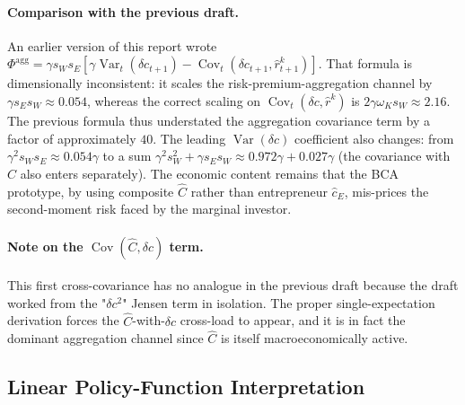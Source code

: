 \documentclass[11pt]{article}
\newcommand{\Var}{\operatorname{Var}}
\newcommand{\Cov}{\operatorname{Cov}}
\theoremstyle{plain}
\theoremstyle{definition}
\begin{document}
\paragraph{Comparison with the previous draft.}
An earlier version of this report wrote
$\Phi^{\mathrm{agg}}=\gamma s_W s_E[\gamma\Var_t(\delta c_{t+1})
-\Cov_t(\delta c_{t+1},\hat r^k_{t+1})]$.
That formula is dimensionally inconsistent: it scales the
risk-premium-aggregation channel by $\gamma s_E s_W \approx 0.054$,
whereas the correct scaling on $\Cov_t(\delta c,\hat r^k)$ is
$2\gamma\omega_K s_W \approx 2.16$. The previous formula thus understated the
aggregation covariance term by a factor of approximately $40$. The leading
$\Var(\delta c)$ coefficient also changes: from
$\gamma^2 s_W s_E \approx 0.054 \gamma$ to a sum
$\gamma^2 s_W^2 + \gamma s_E s_W \approx 0.972\gamma + 0.027\gamma$ (the
covariance with $\hat C$ also enters separately). The economic content remains
that the BCA prototype, by using composite $\hat C$ rather than entrepreneur
$\hat c_E$, mis-prices the second-moment risk faced by the marginal investor.

\paragraph{Note on the $\Cov(\hat C,\delta c)$ term.}
This first cross-covariance has no analogue in the previous draft because the
draft worked from the "$\delta c^2$" Jensen term in isolation. The proper
single-expectation derivation forces the $\hat C$-with-$\delta c$ cross-load
to appear, and it is in fact the dominant aggregation channel since
$\hat C$ is itself macroeconomically active.

\subsection{Linear Policy-Function Interpretation}
\end{document}

